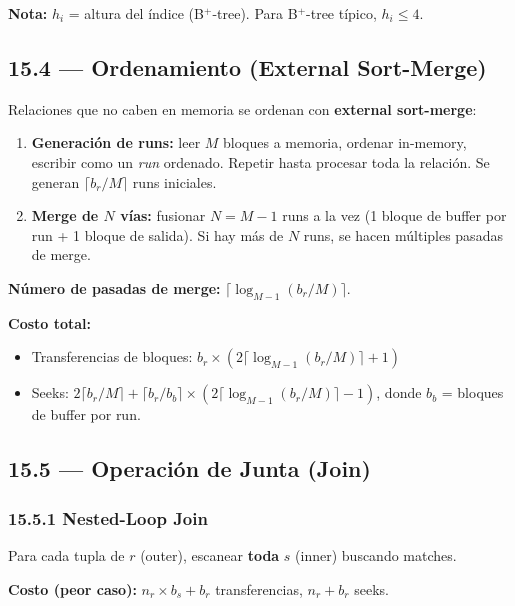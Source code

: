 \documentclass[11pt, a4paper]{article}
\begin{document}
\vspace{0.5em}
\textbf{Nota:} $h_i$ = altura del índice (B$^+$-tree). Para B$^+$-tree típico, $h_i \leq 4$.

\subsection{15.4 --- Ordenamiento (External Sort-Merge)}

Relaciones que no caben en memoria se ordenan con \textbf{external sort-merge}:

\begin{enumerate}[nosep]
	\item \textbf{Generación de runs:} leer $M$ bloques a memoria, ordenar in-memory, escribir como un \textit{run} ordenado. Repetir hasta procesar toda la relación. Se generan $\lceil b_r / M \rceil$ runs iniciales.
	\item \textbf{Merge de $N$ vías:} fusionar $N = M - 1$ runs a la vez (1 bloque de buffer por run + 1 bloque de salida). Si hay más de $N$ runs, se hacen múltiples pasadas de merge.
\end{enumerate}

\textbf{Número de pasadas de merge:} $\lceil \log_{M-1}(b_r / M) \rceil$.

\textbf{Costo total:}
\begin{itemize}[nosep]
	\item Transferencias de bloques: $b_r \times (2 \lceil \log_{M-1}(b_r/M) \rceil + 1)$
	\item Seeks: $2 \lceil b_r / M \rceil + \lceil b_r / b_b \rceil \times (2 \lceil \log_{M-1}(b_r/M) \rceil - 1)$, donde $b_b$ = bloques de buffer por run.
\end{itemize}

\subsection{15.5 --- Operación de Junta (Join)}

\subsubsection{15.5.1 Nested-Loop Join}

Para cada tupla de $r$ (outer), escanear \textbf{toda} $s$ (inner) buscando matches.

\textbf{Costo (peor caso):} $n_r \times b_s + b_r$ transferencias, $n_r + b_r$ seeks.
\end{document}
